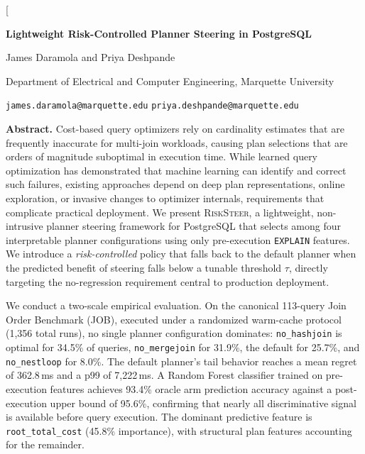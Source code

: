 \documentclass[sigconf,natbib=false]{article}
\renewenvironment{abstract}
  {\small\quotation\noindent\textbf{Abstract.}\enspace}
  {\endquotation}
\newcommand{\postgres}{PostgreSQL}
\newcommand{\arm}[1]{\texttt{#1}}
\newcommand{\sys}{\textsc{RiskSteer}}
\newcommand{\threshold}{\tau}
\begin{document}

\twocolumn[{%
\begin{center}
  {\LARGE\bfseries Lightweight Risk-Controlled Planner Steering in \postgres\par}
  \vspace{10pt}
  {\large James Daramola \quad and \quad Priya Deshpande\par}
  \vspace{4pt}
  {\normalsize Department of Electrical and Computer Engineering, Marquette University\par}
  {\normalsize \texttt{james.daramola@marquette.edu}\quad
               \texttt{priya.deshpande@marquette.edu}\par}
  \vspace{12pt}
\end{center}

\begin{abstract}
Cost-based query optimizers rely on cardinality estimates that are frequently inaccurate for
multi-join workloads, causing plan selections that are orders of magnitude suboptimal in
execution time. While learned query optimization has demonstrated that machine learning can
identify and correct such failures, existing approaches depend on deep plan representations,
online exploration, or invasive changes to optimizer internals, requirements that complicate
practical deployment. We present \sys{}, a lightweight, non-intrusive planner steering
framework for \postgres{} that selects among four interpretable planner configurations using
only pre-execution \texttt{EXPLAIN} features. We introduce a \emph{risk-controlled} policy
that falls back to the default planner when the predicted benefit of steering falls below a
tunable threshold $\threshold$, directly targeting the no-regression requirement central to
production deployment.

We conduct a two-scale empirical evaluation. On the canonical 113-query Join Order Benchmark
(JOB), executed under a randomized warm-cache protocol (1{,}356 total runs), no single planner
configuration dominates: \arm{no\_hashjoin} is optimal for 34.5\% of queries,
\arm{no\_mergejoin} for 31.9\%, the default for 25.7\%, and \arm{no\_nestloop} for 8.0\%.
The default planner's tail behavior reaches a mean regret of 362.8\,ms and a p99 of
7{,}222\,ms. A Random Forest classifier trained on pre-execution features achieves 93.4\%
oracle arm prediction accuracy against a post-execution upper bound of 95.6\%, confirming
that nearly all discriminative signal is available before query execution. The dominant
predictive feature is \texttt{root\_total\_cost} (45.8\% importance), with structural plan
features accounting for the remainder.


\end{abstract}}
\end{document}
